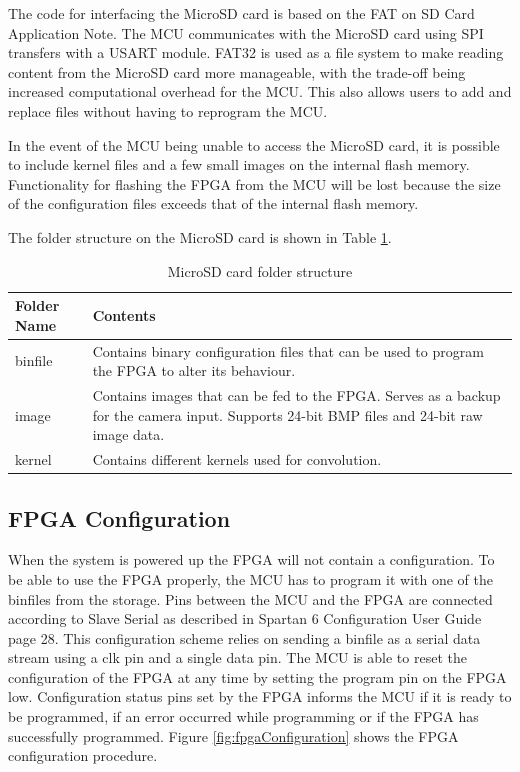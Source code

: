 The code for interfacing the MicroSD card is based on the FAT on SD Card Application Note\cite{an0030}. The MCU communicates with the MicroSD card using SPI transfers with a USART module. FAT32 is used as a file system to make reading content from the MicroSD card more manageable, with the trade-off being increased computational overhead for the MCU. This also allows users to add and replace files without having to reprogram the MCU.

In the event of the MCU being unable to access the MicroSD card, it is possible to include kernel files and a few small images on the internal flash memory. Functionality for flashing the FPGA from the MCU will be lost because the size of the configuration files exceeds that of the internal flash memory.

The folder structure on the MicroSD card is shown in Table \ref{microsd_folder}.

\begin{table}[h!]
\centering
	\begin{tabular}{ | l | p{10cm} |}
		\hline
		Folder Name & Contents \\ \hline
		binfile & Contains binary configuration files that can be used to program the FPGA to alter its behaviour. \\ \hline
		image & Contains images that can be fed to the FPGA. Serves as a backup for the camera input. Supports 24-bit BMP files and 24-bit raw image data. \\ \hline
		kernel & Contains different kernels used for convolution. \\ \hline
	\end{tabular}
	\caption{MicroSD card folder structure}
	\label{microsd_folder}
\end{table}


\subsection{FPGA Configuration}
When the system is powered up the FPGA will not contain a configuration. To be able to use the FPGA properly, the MCU has to program it with one of the binfiles from the storage. Pins between the MCU and the FPGA are connected according to Slave Serial as described in Spartan 6 Configuration User Guide\cite{ug380} page 28. This configuration scheme relies on sending a binfile as a serial data stream using a clk pin and a single data pin. The MCU is able to reset the configuration of the FPGA at any time by setting the program pin on the FPGA low. Configuration status pins set by the FPGA informs the MCU if it is ready to be programmed, if an error occurred while programming or if the FPGA has successfully programmed. Figure \ref{fig:fpgaConfiguration} shows the FPGA configuration procedure. 


